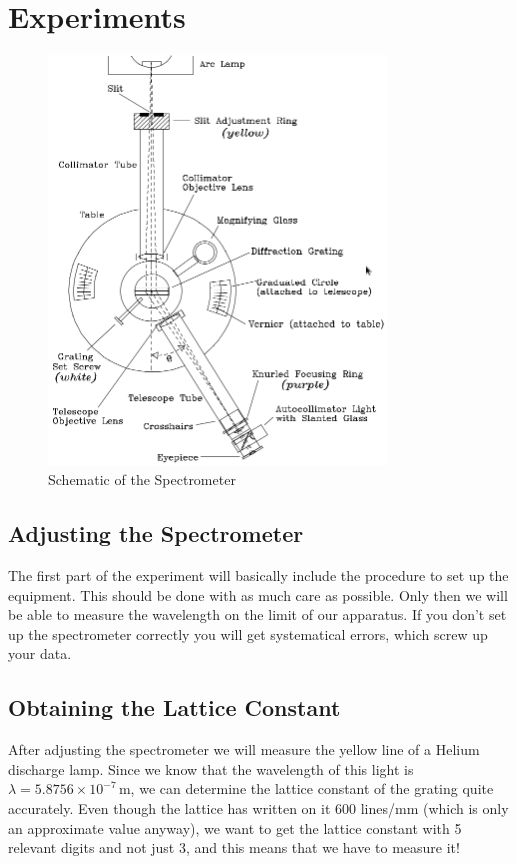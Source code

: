 \section{Experiments}
\begin{figure}[h!]
\centering
\includegraphics[width=0.8\textwidth]{./Exp9/pic/image7.png}
\caption{Schematic of the Spectrometer}
\end{figure} 

\subsection{Adjusting the Spectrometer}
The first part of the experiment will basically include the procedure to set up the equipment. This should be done with as much care as possible. Only then we will be able to measure the wavelength on the limit of our apparatus. If you don't set up the spectrometer correctly you will get systematical errors, which screw up your data. 

\subsection{Obtaining the Lattice Constant}
 After adjusting the spectrometer we will measure the yellow line of a Helium discharge lamp. Since we know that the wavelength of this light is $\lambda = 5.8756\times 10^{-7}\,\mathrm{m}$, we can determine the lattice constant of the grating quite accurately. Even though the lattice has written on it 600 lines/mm (which is only an approximate value anyway), we want to get the lattice constant with 5 relevant digits and not just 3, and this means that we have to measure it!

